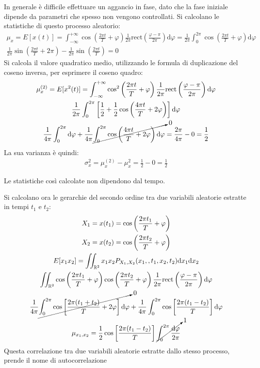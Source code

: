 \documentclass{article}
\newcommand{\rect}{\mathrm{rect}}
\newcommand{\df}{\mathrm{d}}
\numberwithin{equation}{subsection}
\begin{document}
In generale è difficile effettuare un aggancio in fase, dato che la fase iniziale dipende da parametri che spesso non vengono controllati. 
Si calcolano le statistiche di questo processo aleatorio:
\begin{gather*}
    \mu_{x}=E[x(t)]=\displaystyle\int_{-\infty}^{+\infty}\cos\left(\frac{2\pi t}{T}+\varphi\right)\frac{1}{2\pi}\rect\left(\frac{\varphi-\pi}{2\pi}\right)\df\varphi=\frac{1}{2\pi}\int_0^{2\pi}\cos\left(\frac{2\pi t}{T}+\varphi\right)\df\varphi\\
    \frac{1}{2\pi}\sin\left(\frac{2\pi t}{T}+2\pi\right)-\frac{1}{2\pi}\sin\left(\frac{2\pi t}{T}\right)=0
\end{gather*}
Si calcola il valore quadratico medio, utilizzando le formula di duplicazione del coseno inversa, per esprimere il coseno quadro:
\begin{gather*}
    \mu_{x}^{(2)}=E[x^2(t)]=\displaystyle\int_{-\infty}^{+\infty}\cos^2\left(\frac{2\pi t}{T}+\varphi\right)\frac{1}{2\pi}\rect\left(\frac{\varphi-\pi}{2\pi}\right)\df\varphi\\
    \frac{1}{2\pi}\int_0^{2\pi}\left[\frac{1}{2}+\frac{1}{2}\cos\left(\frac{4\pi t}{T}+2\varphi\right)\right]\df\varphi\\
    \frac{1}{4\pi}\int_0^{2\pi}\df\varphi+\frac{1}{4\pi}\cancelto{0}{\int_0^{2\pi}\cos\left(\frac{4\pi t}{T}+2\varphi\right)\df\varphi}=\frac{2\pi}{4\pi}-0=\frac{1}{2}
\end{gather*}
La sua varianza è quindi:
\begin{gather*}
    \sigma_x^2=\mu_x^{(2)}-\mu_x^2=\displaystyle\frac{1}{2}-0=\frac{1}{2}
\end{gather*}

Le statistiche così calcolate non dipendono dal tempo. 

Si calcolano ora le gerarchie del secondo ordine tra due variabili aleatorie estratte in tempi $t_1$ e $t_2$:
\begin{gather*}
    X_1=x(t_1)=\displaystyle\cos\left(\frac{2\pi t_1}{T}+\varphi\right)\\
    X_2=x(t_2)=\displaystyle\cos\left(\frac{2\pi t_2}{T}+\varphi\right)\\
    E[x_1x_2]=\displaystyle\iint_{\mathbb{R}^2}x_1x_2P_{X_1,X_2}(x_1,,t_1,x_2,t_2)\df x_1\df x_2\\
    \displaystyle\iint_{\mathbb{R}^2}\cos\left(\frac{2\pi t_1}{T}+\varphi\right)\cos\left(\frac{2\pi t_2}{T}+\varphi\right)\frac{1}{2\pi}\rect\left(\frac{\varphi-\pi}{2\pi}\right)\df\varphi\\
    \displaystyle\frac{1}{4\pi}\cancelto{0}{\int_{0}^{2\pi}\cos\left[\frac{2\pi(t_1+t_2)}{T}+2\varphi\right]\df\varphi}+\frac{1}{4\pi}\int_{0}^{2\pi}\cos\left[\frac{2\pi(t_1-t_2)}{T}\right]\df\varphi\\
    \mu_{x_1,x_2}=\displaystyle\frac{1}{2}\cos\left[\frac{2\pi(t_1-t_2)}{T}\right]\cancelto{1}{\int_0^{2\pi}\frac{\df\varphi}{2\pi}}
\end{gather*}
Questa correlazione tra due variabili aleatorie estratte dallo stesso processo, prende il nome di autocorrelazione
\end{document}
